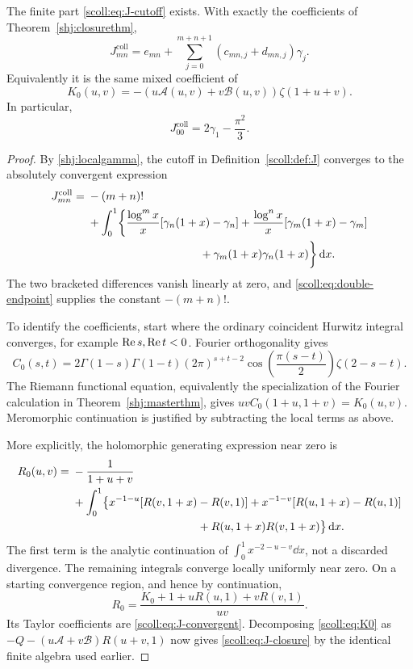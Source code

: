 \begin{theorem}
\label{scoll:thm:coincident}
The finite part \eqref{scoll:eq:J-cutoff} exists. With exactly the coefficients
of Theorem~\ref{shj:closurethm},
\begin{equation}
 J_{mn}^{\mathrm{coll}}=e_{mn}+\sum_{j=0}^{m+n+1}(c_{mn,j}+d_{mn,j})\gamma_j.
 \label{scoll:eq:J-closure}
\end{equation}
Equivalently it is the same mixed coefficient of
\begin{equation}
 K_0(u,v)=-(u\mathcal A(u,v)+v\mathcal B(u,v))\zeta(1+u+v).
 \label{scoll:eq:K0}
\end{equation}
In particular,
\begin{equation}
 J_{00}^{\mathrm{coll}}=2\gamma_1-\frac{\pi^2}{3}.
 \label{scoll:eq:J00}
\end{equation}
\end{theorem}
\begin{proof}
By \eqref{shj:localgamma}, the cutoff in Definition~\ref{scoll:def:J}
converges to the absolutely convergent expression
\begin{align}
 J_{mn}^{\mathrm{coll}}={}&-(m+n)!\notag\\
 &+\int_0^1\biggl\{
 \frac{\log^m x}{x}[\gamma_n(1+x)-\gamma_n]
 +\frac{\log^n x}{x}[\gamma_m(1+x)-\gamma_m]\notag\\
 &\hspace{35mm}+\gamma_m(1+x)\gamma_n(1+x)\biggr\}\dd x.
 \label{scoll:eq:J-convergent}
\end{align}
The two bracketed differences vanish linearly at zero, and
\eqref{scoll:eq:double-endpoint} supplies the constant $-(m+n)!$.

To identify the coefficients, start where the ordinary coincident
Hurwitz integral converges, for example $\operatorname{Re} s,\operatorname{Re} t<0$.
Fourier orthogonality gives
\[
 C_0(s,t)=2\Gamma(1-s)\Gamma(1-t)(2\pi)^{s+t-2}
       \cos\!\left(\frac{\pi(s-t)}2\right)\zeta(2-s-t).
\]
The Riemann functional equation, equivalently the specialization of the
Fourier calculation in Theorem~\ref{shj:masterthm}, gives
$uvC_0(1+u,1+v)=K_0(u,v)$. Meromorphic continuation is justified by
subtracting the local terms as above.

More explicitly, the holomorphic generating expression near zero is
\begin{align*}
 R_0(u,v)={}&-\frac1{1+u+v}\\
 &+\int_0^1\bigl\{
 x^{-1-u}[R(v,1+x)-R(v,1)]
 +x^{-1-v}[R(u,1+x)-R(u,1)]\\
 &\hspace{39mm}+R(u,1+x)R(v,1+x)\bigr\}\dd x.
\end{align*}
The first term is the analytic continuation of
$\int_0^1x^{-2-u-v}\dd x$, not a discarded divergence. The remaining
integrals converge locally uniformly near zero. On a starting convergence
region, and hence by continuation,
\[
 R_0=\frac{K_0+1+uR(u,1)+vR(v,1)}{uv}.
\]
Its Taylor coefficients are \eqref{scoll:eq:J-convergent}. Decomposing
\eqref{scoll:eq:K0} as $-Q-(u\mathcal A+v\mathcal B)R(u+v,1)$ now gives
\eqref{scoll:eq:J-closure} by the identical finite algebra used earlier.
\end{proof}

